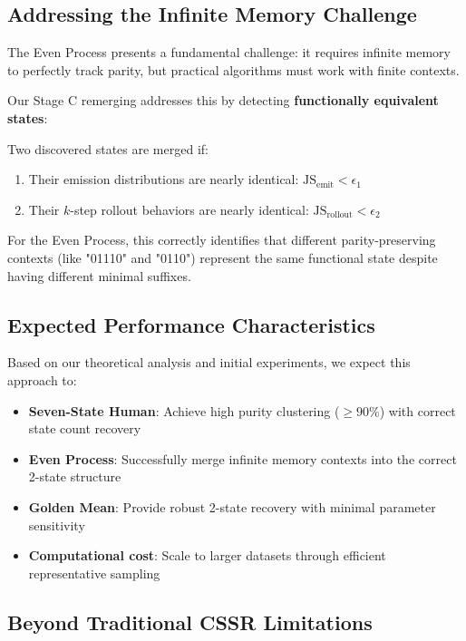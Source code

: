 \documentclass[11pt]{article}
\begin{document}
\subsection{Addressing the Infinite Memory Challenge}

The Even Process presents a fundamental challenge: it requires infinite memory to perfectly track parity, but practical algorithms must work with finite contexts.

\begin{notebox}
Our Stage C remerging addresses this by detecting \textbf{functionally equivalent states}:

Two discovered states are merged if:
\begin{enumerate}
\item Their emission distributions are nearly identical: $\text{JS}_{\text{emit}} < \epsilon_1$
\item Their $k$-step rollout behaviors are nearly identical: $\text{JS}_{\text{rollout}} < \epsilon_2$
\end{enumerate}

For the Even Process, this correctly identifies that different parity-preserving contexts (like "01110" and "0110") represent the same functional state despite having different minimal suffixes.
\end{notebox}

\subsection{Expected Performance Characteristics}

Based on our theoretical analysis and initial experiments, we expect this approach to:

\begin{itemize}
\item \textbf{Seven-State Human}: Achieve high purity clustering ($\geq 90\%$) with correct state count recovery
\item \textbf{Even Process}: Successfully merge infinite memory contexts into the correct 2-state structure
\item \textbf{Golden Mean}: Provide robust 2-state recovery with minimal parameter sensitivity
\item \textbf{Computational cost}: Scale to larger datasets through efficient representative sampling
\end{itemize}

\subsection{Beyond Traditional CSSR Limitations}
\end{document}
